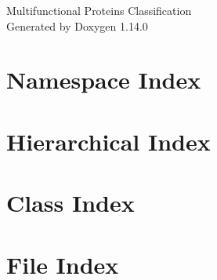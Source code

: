 \documentclass[twoside]{book}
\newcommand{\+}{\discretionary{\mbox{\scriptsize$\hookleftarrow$}}{}{}}
\newcommand{\clearemptydoublepage}{%
    \newpage{\pagestyle{empty}\cleardoublepage}%
  }
\begin{document}
  \raggedbottom
    \hypersetup{pageanchor=false,
                bookmarksnumbered=true,
                pdfencoding=unicode
               }
  \begin{titlepage}
  \vspace*{7cm}
  \begin{center}%
  {\Large Multifunctional Proteins Classification}\\
  \vspace*{1cm}
  {\large Generated by Doxygen 1.14.0}\\
  \end{center}
  \end{titlepage}
  \clearemptydoublepage
  \tableofcontents
  \clearemptydoublepage
  \hypersetup{pageanchor=true}
\chapter{Namespace Index}

\chapter{Hierarchical Index}

\chapter{Class Index}

\chapter{File Index}

\end{document}
